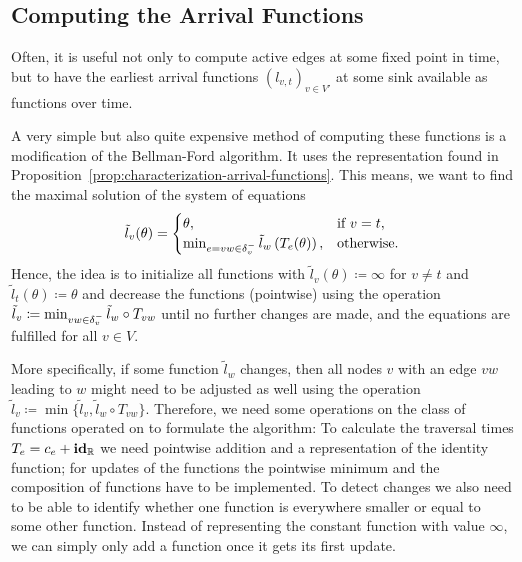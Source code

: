 \subsection{Computing the Arrival Functions}

Often, it is useful not only to compute active edges at some fixed point in time, but to have the earliest arrival functions $(l_{v,t})_{v\in V'}$ at some sink available as functions over time.

A very simple but also quite expensive method of computing these functions is a modification of the Bellman-Ford algorithm. 
It uses the representation found in Proposition~\ref{prop:characterization-arrival-functions}.
This means, we want to find the maximal solution of the system of equations \[
    \tilde l_v(\theta) = \begin{cases}
        \theta, &\text{if $v = t$}, \\
        \min_{\substack{
            e=vw\in\delta^-_{v}               
        }} \tilde{l}_w\left(
            T_e(\theta)
        \right), &\text{otherwise}.
    \end{cases}
\]
Hence, the idea is to initialize all functions with $\tilde l_v(\theta) \coloneqq \infty$ for $v\neq t$ and $\tilde l_t(\theta) \coloneqq \theta$ and decrease the functions (pointwise) using the operation $\tilde l_v \coloneqq \min_{vw\in\delta^-_{v}} \tilde l_w \circ T_{vw}$ until no further changes are made, and the equations are fulfilled for all $v\in V$.

More specifically, if some function $\tilde l_w$ changes, then all nodes $v$ with an edge $vw$ leading to $w$ might need to be adjusted as well using the operation $\tilde l_v \coloneqq \min\{ \tilde l_v, \tilde l_w \circ T_{vw} \}$.
Therefore, we need some operations on the class of functions operated on to formulate the algorithm:
To calculate the traversal times $T_e = c_e + \mathbf{id}_{\mathbb{R}}$ we need pointwise addition and a representation of the identity function; for updates of the functions the pointwise minimum and the composition of functions have to be implemented.
To detect changes we also need to be able to identify whether one function is everywhere smaller or equal to some other function. 
Instead of representing the constant function with value $\infty$, we can simply only add a function once it gets its first update.

